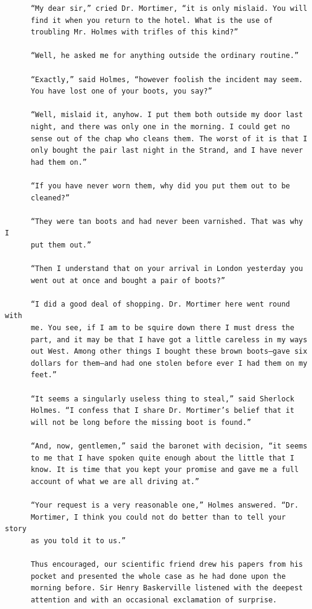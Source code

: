 \documentclass{article}
\begin{document}
\begin{verbatim}
      “My dear sir,” cried Dr. Mortimer, “it is only mislaid. You will
      find it when you return to the hotel. What is the use of
      troubling Mr. Holmes with trifles of this kind?”

      “Well, he asked me for anything outside the ordinary routine.”

      “Exactly,” said Holmes, “however foolish the incident may seem.
      You have lost one of your boots, you say?”

      “Well, mislaid it, anyhow. I put them both outside my door last
      night, and there was only one in the morning. I could get no
      sense out of the chap who cleans them. The worst of it is that I
      only bought the pair last night in the Strand, and I have never
      had them on.”

      “If you have never worn them, why did you put them out to be
      cleaned?”

      “They were tan boots and had never been varnished. That was why I
      put them out.”

      “Then I understand that on your arrival in London yesterday you
      went out at once and bought a pair of boots?”

      “I did a good deal of shopping. Dr. Mortimer here went round with
      me. You see, if I am to be squire down there I must dress the
      part, and it may be that I have got a little careless in my ways
      out West. Among other things I bought these brown boots—gave six
      dollars for them—and had one stolen before ever I had them on my
      feet.”

      “It seems a singularly useless thing to steal,” said Sherlock
      Holmes. “I confess that I share Dr. Mortimer’s belief that it
      will not be long before the missing boot is found.”

      “And, now, gentlemen,” said the baronet with decision, “it seems
      to me that I have spoken quite enough about the little that I
      know. It is time that you kept your promise and gave me a full
      account of what we are all driving at.”

      “Your request is a very reasonable one,” Holmes answered. “Dr.
      Mortimer, I think you could not do better than to tell your story
      as you told it to us.”

      Thus encouraged, our scientific friend drew his papers from his
      pocket and presented the whole case as he had done upon the
      morning before. Sir Henry Baskerville listened with the deepest
      attention and with an occasional exclamation of surprise.


\end{verbatim}
\end{document}
